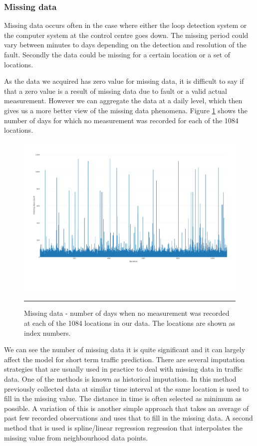 \subsubsection{Missing data}
Missing data occurs often in the case where either the loop detection system or the computer system
at the control centre goes down. The missing period could vary between minutes to days depending on
the detection and resolution of the fault. Secondly the data could be missing for a certain location
or a set of locations.


As the data we acquired has zero value for missing data, it is difficult to say if that a zero value
is a result of missing data due to fault or a valid actual measurement. However we can aggregate the
data at a daily level, which then gives us a more better view of the missing data phenomena. Figure
\ref{fig:missing-days-count} shows the number of days for which no measurement was recorded for each
of the 1084 locations.

\begin{figure}[htbp]
  \centering
    \includegraphics[width=\textwidth,height=\textheight,keepaspectratio]{Plots/missing-days-count.pdf}
    \rule{35em}{0.5pt}
  \caption[Missing data]{Missing data - number of days when no measurement was recorded at each of
  the 1084 locations in our data. The locations are shown as index numbers.}
  \label{fig:missing-days-count}
\end{figure}

We can see the number of missing data it is quite significant and it can largely affect the model for
short term traffic prediction. There are several imputation strategies that are usually used in practice
to deal with missing data in traffic data. One of the methods is known as historical imputation. In this
method previously collected data at similar time interval at the same location is used to fill in the missing
value. The distance in time is often selected as minimum as possible. A variation of this is another
simple approach that takes an average of past few recorded observations and uses that to fill in
the missing data. A second method that is used is spline/linear regression regression that interpolates
the missing value from neighbourhood data points.

